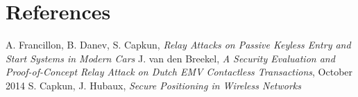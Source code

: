 \documentclass{article}
\begin{document}
\section{References}
\begin{thebibliography}{99}
A. Francillon, B. Danev, S. Capkun, \emph{Relay Attacks on Passive Keyless Entry and Start Systems in Modern Cars}
J. van den Breekel, \emph{A Security Evaluation and Proof-of-Concept Relay Attack on Dutch EMV Contactless Transactions}, October 2014
S. Capkun, J. Hubaux, \emph{Secure Positioning in Wireless Networks}
\end{thebibliography}
\end{document}

